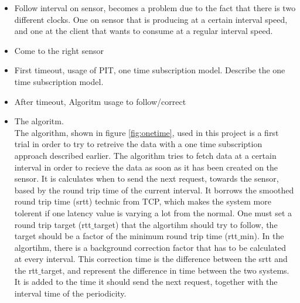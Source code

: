\begin{itemize}
\item Follow interval on sensor, becomes a problem due to the fact that there is two different clocks. One on sensor that is producing at a certain interval speed, and one at the client that wants to consume at a regular interval speed.
\item Come to the right sensor
\item First timeout, usage of PIT, one time subscription model. Describe the one time subscription model.
\item After timeout, Algoritm usage to follow/correct


\item The algoritm.\\
The algorithm, shown in figure \ref{fig:onetime}, used in this project is a first trial in order to try to retreive the data with a one time subscription approach described earlier. 
The algorithm tries to fetch data at a certain interval in order to recieve the data as soon as it has been created on the sensor. It is calculates when to send the next request, towards the sensor, based by the round trip time of the current interval. It borrows the smoothed round trip time (srtt) technic from TCP, which makes the system more tolerent if one latency value is varying a lot from the normal. One must set a round trip target (rtt$\_$target) that the algortihm should try to follow, the target should be a factor of the minimum round trip time (rtt$\_$min). In the algortihm, there is a background correction factor that has to be calculated at every interval. This correction time is the difference between the srtt and the rtt$\_$target, and represent the difference in time between the two systems. It is added to the time it should send the next request, together with the interval time of the periodicity.



\end{itemize}


